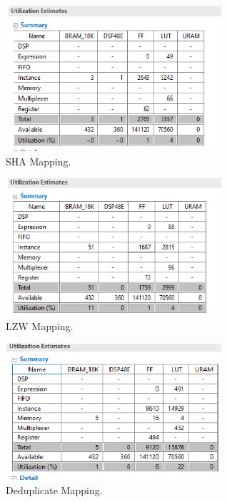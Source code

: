 \documentclass{article}
\begin{document}
\begin{figure}[h!]
  \includegraphics[width=80mm, scale=0.5]{sha.png}
  \caption{SHA Mapping.}
  \label{fig:sha_mapping}
\end{figure}

\begin{figure}[h!]
  \includegraphics[width=80mm, scale=0.5]{lzw.png}
  \caption{LZW Mapping.}
  \label{fig:lzw_mapping}
\end{figure}

\begin{figure}[h!]
  \includegraphics[width=80mm, scale=0.5]{deduplicate.png}
  \caption{Deduplicate Mapping.}
  \label{fig:deduplicate_mapping}
\end{figure}
\end{document}
